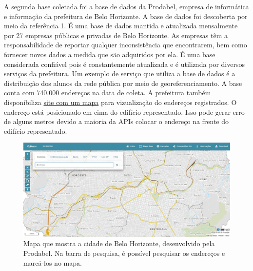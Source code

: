 A segunda base coletada foi a base de dados da \href{https://prefeitura.pbh.gov.br/prodabel}{Prodabel}, empresa de informática e informação da prefeitura de Belo Horizonte. A base de dados foi descoberta por meio da referência 1. É uma base de dados mantida e atualizada mensalmente por 27 empresas públicas e privadas de Belo Horizonte. As empresas têm a responsabilidade de reportar qualquer inconsistência que encontrarem, bem como fornecer novos dados a medida que são adquiridos por ela. É uma base considerada confiável pois é constantemente atualizada e é utilizada por diversos serviços da prefeitura. Um exemplo de serviço que utiliza a base de dados é a distribuição dos alunos da rede pública por meio de georeferenciamento. A base conta com 740.000 endereços na data de coleta. A prefeitura também disponibiliza \href{https://bhmap.pbh.gov.br}{site com um mapa} para vizualização do endereços registrados. O endereço está posicionado em cima do edifício representado. Isso pode gerar erro de alguns metros devido a maioria da APIs colocar o endereço na frente do edifício representado. 

\begin{figure}
    \centering
    \includegraphics[width=\textwidth]{Figuras/siteProdabel.jpeg}
    \caption{Mapa que mostra a cidade de Belo Horizonte, desenvolvido pela Prodabel. Na barra de pesquisa, é possível pesquisar os endereços e marcá-los no mapa.}
    \label{fig:siteProdabel}
\end{figure}




